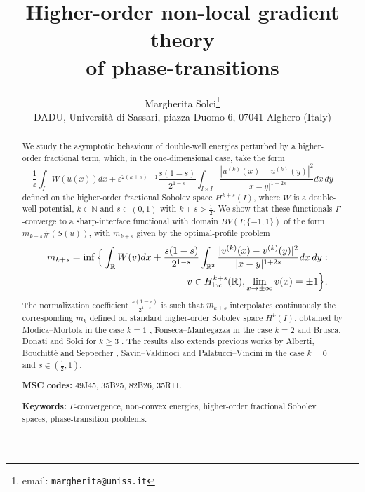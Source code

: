 \documentclass{article}
\title{Higher-order non-local gradient theory\\ of phase-transitions}
\author{Margherita Solci\footnote{email: {\tt margherita@uniss.it}}\\ 
{\small DADU, Universit\`a di Sassari,} {\small piazza Duomo 6, 07041 Alghero (Italy)}}
\date{}
\newcommand{\e}{\varepsilon}
\begin{document}
 

\maketitle
\begin{abstract} 
We study the asymptotic behaviour of double-well energies perturbed by a higher-order fractional term, which, in the one-dimensional case, take the form
$$
\frac1\e\int_I W(u(x))dx+\e^{2(k+s)-1}\frac{s(1-s)}{2^{1-s}}\int_{I\times I} \frac{|u^{(k)}(x)-u^{(k)}(y)|^2}{|x-y|^{1+2s}} dx\,dy
$$
defined on the higher-order fractional Sobolev space $H^{k+s}(I)$,
where $W$ is a double-well potential, $k\in \mathbb N$ and $s\in(0,1)$ with $k+s>\frac12$. 
We show that these functionals $\Gamma$-converge to a sharp-interface functional with domain $BV(I;\{-1,1\})$ of the form $m_{k+s}\#(S(u))$, with $m_{k+s}$ given by the optimal-profile problem
\begin{eqnarray*}
&&m_{k+s} =\inf\Big\{\int_{\mathbb R} W(v)dx+\frac{s(1-s)}{2^{1-s}}\int_{\mathbb R^2}\frac{|v^{(k)}(x)-v^{(k)}(y)|^2}{|x-y|^{1+2s}} dx\,dy :\\
&& \hskip5cm v\in H^{k+s}_{\rm loc}(\mathbb R), \lim_{x\to\pm\infty}v(x)=\pm1\Big\}.
\end{eqnarray*}
The normalization coefficient $\frac{s(1-s)}{2^{1-s}}$ is such that $m_{k+s}$ interpolates continuously the corresponding $m_k$ defined on standard higher-order Sobolev space $H^k(I)$, obtained by Modica--Mortola in the case $k=1$ \cite{MM}, Fonseca--Mantegazza in the case $k=2$ \cite{FM} and Brusca, Donati and Solci  for $k\ge 3$ \cite{BDS}. The results also extends previous works by Alberti, Bouchitt\'e and Seppecher \cite{ABS}, Savin--Valdinoci \cite{SV} and Palatucci--Vincini \cite{PaVi} in the case $k=0$ and $s\in(\frac12,1)$.
\smallskip

{\bf MSC codes:} 49J45, 35B25, 82B26, 35R11.

{\bf Keywords:} $\Gamma$-convergence, non-convex energies, higher-order fractional Sobolev spaces, phase-transition problems.

\end{abstract}
\end{document}

